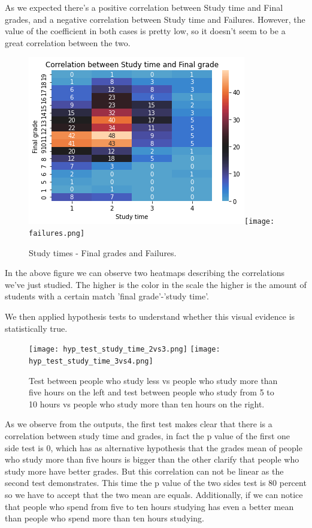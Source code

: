 \documentclass[a4paper, 11pt]{report}
\theoremstyle{definition}
\numberwithin{equation}{section}		%
\numberwithin{table}{section}				%
\begin{document}
\begin{itemize}
As we expected there's a positive correlation between Study time and Final grades, and a negative correlation between Study time and Failures. However, the value of the coefficient in both cases is pretty low, so it doesn't seem to be a great correlation between the two. 

\begin{figure}[h]\centering
\includegraphics[scale=0.5]{g3-st.png}\quad\texttt{[image: failures.png]}
\caption{Study times - Final grades and Failures.}
\end{figure}

In the above figure we can observe two heatmaps describing the correlations we've just studied. The higher is the color in the scale the higher is the amount of students with a certain match 'final grade'-'study time'.

We then applied hypothesis tests to understand whether this visual evidence 
is statistically true.

\begin{figure}[h]\centering
\texttt{[image: hyp\_test\_study\_time\_2vs3.png]}
\texttt{[image: hyp\_test\_study\_time\_3vs4.png]}
\caption{Test between people who study less vs people who study more than five hours on the left and test between people who study from 5 to 10 hours
vs people who study more than ten hours on the right.}
\end{figure}

As we observe from the outputs, the first test makes clear that there is a
correlation between study time and grades, in fact the p value of the first 
one side test is 0, which has as alternative hypothesis that the grades mean of people who study more than five hours is bigger than the other clarify that people who study more have better grades.  But this correlation can not
be linear as the second test demonstrates. This time the p value of the two
sides test is 80 percent so we have to accept that the two mean are equals. 
Additionally, if we can notice that people who spend from five to ten hours 
studying has even a better mean than people who spend more than ten hours 
studying.



\end{itemize}
\end{document}
